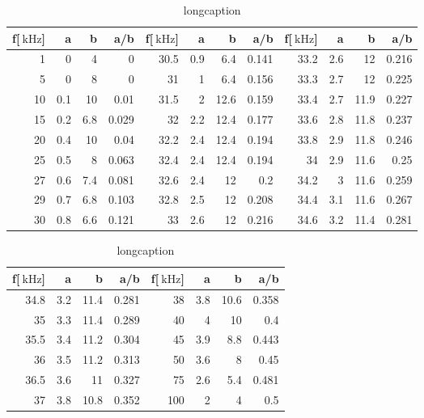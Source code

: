 \begin{table}
\begin{center}
\begin{tabular}{r|r|r|r|r|r|r|r|r|r|r|r|}
f[$\SI{}{\kilo\hertz}$] & a & b & a/b & f[$\SI{}{\kilo\hertz}$] & a & b & a/b & f[$\SI{}{\kilo\hertz}$] & a & b & a/b\\
\hline
1 & 0 & 4 & 0 & 30.5 & 0.9 & 6.4 & 0.141 & 33.2 & 2.6 & 12 & 0.216\\
5 & 0 & 8 & 0 & 31 & 1 & 6.4 & 0.156 & 33.3 & 2.7 & 12 & 0.225\\
10 & 0.1 & 10 & 0.01 & 31.5 & 2 & 12.6 & 0.159 & 33.4 & 2.7 & 11.9 & 0.227\\
15 & 0.2 & 6.8 & 0.029 & 32 & 2.2 & 12.4 & 0.177 & 33.6 & 2.8 & 11.8 & 0.237\\
20 & 0.4 & 10 & 0.04 & 32.2 & 2.4 & 12.4 & 0.194 & 33.8 & 2.9 & 11.8 & 0.246\\
25 & 0.5 & 8 & 0.063 & 32.4 & 2.4 & 12.4 & 0.194 & 34 & 2.9 & 11.6 & 0.25\\
27 & 0.6 & 7.4 & 0.081 & 32.6 & 2.4 & 12 & 0.2 & 34.2 & 3 & 11.6 & 0.259\\
29 & 0.7 & 6.8 & 0.103 & 32.8 & 2.5 & 12 & 0.208 & 34.4 & 3.1 & 11.6 & 0.267\\
30 & 0.8 & 6.6 & 0.121 & 33 & 2.6 & 12 & 0.216 & 34.6 & 3.2 & 11.4 & 0.281\\
\end{tabular}
\end{center}
\begin{center}
\begin{tabular}{r|r|r|r|r|r|r|r}
f[$\SI{}{\kilo\hertz}$] & a & b & a/b & f[$\SI{}{\kilo\hertz}$] & a & b & a/b \\
\hline
34.8 & 3.2 & 11.4 & 0.281 & 38 & 3.8 & 10.6 & 0.358 \\
35 & 3.3 & 11.4 & 0.289 & 40 & 4 & 10 & 0.4 \\
35.5 & 3.4 & 11.2 & 0.304 & 45 & 3.9 & 8.8 & 0.443 \\
36 & 3.5 & 11.2 & 0.313 & 50 & 3.6 & 8 & 0.45 \\
36.5 & 3.6 & 11 & 0.327 & 75 & 2.6 & 5.4 & 0.481 \\
37 & 3.8 & 10.8 & 0.352 & 100 & 2 & 4 & 0.5 \\
\end{tabular}
\caption[smallcaption]{longcaption}
\label{label}
\end{center}
\end{table}
